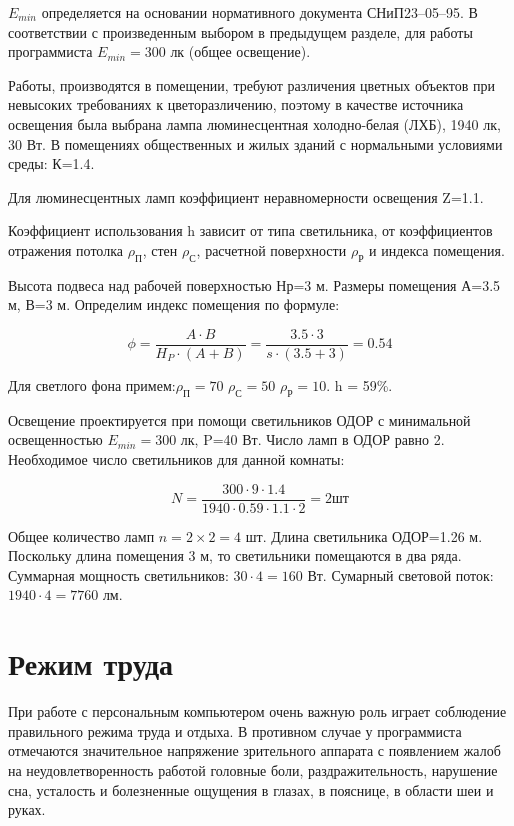 $E_{min}$ определяется на основании нормативного документа СНиП23--05--95. В соответствии с произведенным выбором в предыдущем разделе, для работы программиста $E_{min}=300$ лк (общее освещение).

Работы, производятся в помещении, требуют различения цветных объектов при невысоких требованиях к цветоразличению, поэтому в качестве источника освещения была выбрана лампа люминесцентная холодно-белая (ЛХБ), 1940 лк, 30 Вт. В помещениях общественных и жилых зданий с нормальными условиями среды: К=1.4.

Для люминесцентных ламп коэффициент неравномерности освещения Z=1.1.

Коэффициент использования h зависит от типа светильника, от коэффициентов отражения потолка $\rho_\text{П}$, стен $\rho_\text{С}$, расчетной поверхности $\rho_\text{Р}$ и индекса помещения.

Высота подвеса над рабочей поверхностью Нр=3 м. Размеры помещения А=3.5 м, В=3 м. Определим индекс помещения по формуле:

\begin{equation}
\phi = \frac{A \cdot B}{H_P \cdot (A + B)} = \frac{3.5 \cdot 3}{s \cdot (3.5 + 3)} = 0.54
\end{equation}

Для светлого фона примем:$\rho_\text{П} = 70$ $\rho_\text{С} = 50$ $\rho_\text{Р} = 10$. h = 59\%.

Освещение проектируется при помощи светильников ОДОР с минимальной освещенностью $E_{min}=300$ лк, P=40 Вт. Число ламп в ОДОР равно 2. Необходимое число светильников для данной комнаты:

\begin{equation}
N = \frac{300 \cdot 9 \cdot 1.4}{1940 \cdot 0.59 \cdot 1.1 \cdot 2} = 2 \text{шт}
\end{equation}

Общее количество ламп $n = 2\times2=4$ шт. Длина светильника ОДОР=1.26 м. Поскольку длина помещения 3 м, то светильники помещаются в два ряда. 
Суммарная мощность светильников: $30\cdot4=160$ Вт. Сумарный световой поток: $1940\cdot4=7760$ лм.

\section{Режим труда}
При работе с персональным компьютером очень важную роль играет соблюдение правильного режима труда и отдыха. В противном случае у программиста отмечаются значительное напряжение зрительного аппарата с появлением жалоб на неудовлетворенность работой головные боли, раздражительность, нарушение сна, усталость и болезненные ощущения в глазах, в пояснице, в области шеи и руках.

